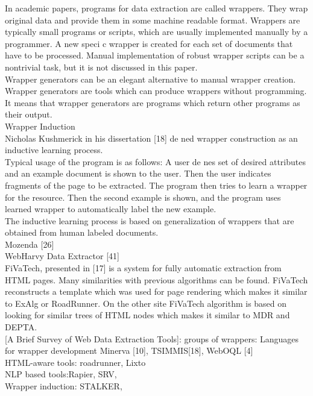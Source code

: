 In academic papers, programs for data extraction are called wrappers. They wrap original data and provide them in some machine readable format. Wrappers are typically small programs or scripts, which are usually implemented manually by a programmer. A new speci c wrapper is created for each set of documents that have to be processed. Manual implementation of robust wrapper scripts can be a nontrivial task, but it is not discussed in this paper.\\
Wrapper generators can be an elegant alternative to manual wrapper creation. Wrapper generators are tools which can produce wrappers without programming. It means that wrapper generators are programs which return other programs as their output. \\
Wrapper Induction\\
Nicholas Kushmerick in his dissertation [18] de ned wrapper construction as an inductive learning process.\\
Typical usage of the program is as follows: A user de nes set of desired attributes and an example document is shown to the user. Then the user indicates fragments of the page to be extracted. The program then tries to learn a wrapper for the resource. Then the second example is shown, and the program uses learned wrapper to automatically label the new example.\\
The inductive learning process is based on generalization of wrappers that are obtained from human labeled documents.\\

Mozenda [26]\\
WebHarvy Data Extractor [41] \\
FiVaTech, presented in [17] is a system for fully automatic extraction from HTML pages. Many similarities with previous algorithms can be found. FiVaTech reconstructs a template which was used for page rendering which makes it similar to ExAlg or RoadRunner. On the other site FiVaTech algorithm is based on looking for similar trees of HTML nodes which makes it similar to MDR and DEPTA.\\


[A Brief Survey of Web Data Extraction Tools]:
groups of wrappers: Languages for wrapper development Minerva [10], TSIMMIS[18], WebOQL [4]\\
HTML-aware tools: roadrunner, Lixto\\

NLP based tools:Rapier, SRV, \\
Wrapper induction: STALKER, \\



